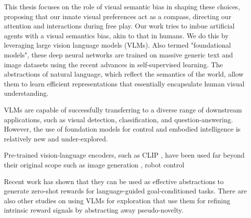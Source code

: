 
This thesis focuses on the role of visual semantic bias in shaping these choices, proposing that our innate visual preferences act as a compass, directing our attention and interactions during free play.
Our work tries to imbue artificial agents with a visual semantics bias, akin to that in humans.
We do this by leveraging large vision language models (VLMs).
Also termed "foundational models", these deep neural networks are trained on massive generic text and image datasets using the recent advances in self-supervised learning. 
The abstractions of natural language, which reflect the semantics of the world, allow them to learn efficient representations that essentially encapsulate human visual understanding.

VLMs are capable of successfully transferring to a diverse range of downstream applications, such as visual detection, classification, and question-answering.
However, the use of foundation models for control and embodied intelligence is relatively new and under-explored.

Pre-trained vision-language encoders, such as CLIP \citep{clip}, have been used far beyond their original scope such as image generation \citep{imagegeneration}, robot control \citep{cliport,embodied}


Recent work \citep{zest,negprompt,vlmrm,lamp} has shown that they can be used as effective abstractions to generate zero-shot rewards for language-guided goal-conditioned tasks.
There are also other studies on using VLMs for exploration \citep{vlmlang,vlmdistill} that use them for refining intrinsic reward signals by abstracting away pseudo-novelty. 

